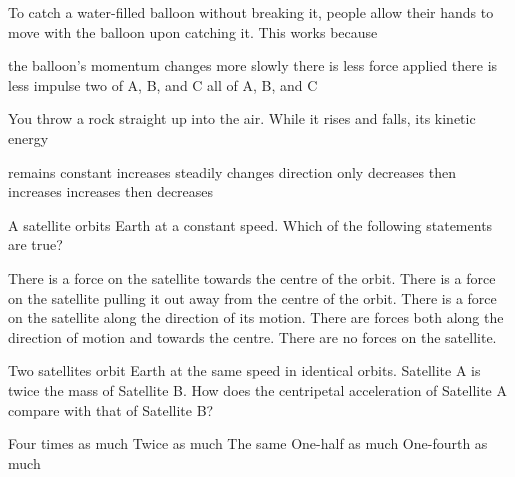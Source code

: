 \documentclass[addpoints,12pt]{exam}
\begin{document}
\begin{questions}
  \question[2] To catch a water-filled balloon without breaking it, people
  allow their hands to move with the balloon upon catching it. This works
  because \underline{\hspace{1in}}
  \begin{choices}
    \choice the balloon's momentum changes more slowly
    \choice there is less force applied
    \choice there is less impulse
    \choice two of A, B, and C
    \choice all of A, B, and C
  \end{choices}
  \vspace{-.2in}\answerline
    
  \question[2] You throw a rock straight up into the air. While it rises and
  falls, its kinetic energy \underline{\hspace{.6in}}
  \begin{choices}
    \choice remains constant
    \choice increases steadily
    \choice changes direction only
    \choice decreases then increases
    \choice increases then decreases
  \end{choices}
  \vspace{-.2in}\answerline
  
  \question[2] A satellite orbits Earth at a constant speed. Which of the
  following statements are true?
  \begin{choices}
    \choice There is a force on the satellite towards the centre of the orbit.
    \choice There is a force on the satellite pulling it out away from the
    centre of the orbit.
    \choice There is a force on the satellite along the direction of its motion.
    \choice There are forces both along the direction of motion and towards
    the centre.
    \choice There are no forces on the satellite.
  \end{choices}
  \vspace{-.2in}\answerline
    
  \question[2] Two satellites orbit Earth at the same speed in identical
  orbits. Satellite A is twice the mass of Satellite B. How does the centripetal
  acceleration of Satellite A compare with that of Satellite B?
  \begin{choices}
    \choice Four times as much
    \choice Twice as much
    \choice The same
    \choice One-half as much
    \choice One-fourth as much
  \end{choices}
  \vspace{-.2in}\answerline
  \newpage
    

\end{questions}
\end{document}
